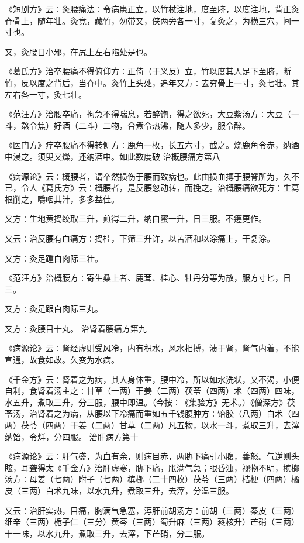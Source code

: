 \documentclass[a4paper,12pt,UTF8,twoside]{ctexbook}
\begin{document}
《短剧方》云∶灸腰痛法∶令病患正立，以竹杖注地，度至脐，以度注地，背正灸脊骨上，随年壮。灸竟，藏竹，勿带又，侠两旁各一寸，复灸之，为横三穴，间一寸也。

又，灸腰目小邪，在尻上左右陷处是也。

《葛氏方》治卒腰痛不得俯仰方∶正倚（于义反）立，竹以度其人足下至脐，断竹，反以度之背后，当脊中。灸竹上头处，追年又方∶去穷骨上一寸，灸七壮。其左右各一寸，灸七壮。

《范汪方》治腰卒痛，拘急不得喘息，若醉饱，得之欲死，大豆紫汤方∶大豆（一斗，熬令焦）好酒（二斗）二物，合煮令热沸，随人多少，服令醉。

《医门方》疗卒腰痛不得转侧方∶鹿角一枚，长五六寸，截之。烧鹿角令赤，纳酒中浸之。须臾又燥，还纳酒中。如此数度破
治概腰痛方第八

《病源论》云∶概腰者，谓卒然损伤于腰而致病也。此由损血搏于腰脊所为，久不已，令人《葛氏方》云∶概腰者，是反腰忽动转，而挽之。治概腰痛欲死方∶生葛根削之，嚼咽其汁，多多益佳。

又方∶生地黄捣绞取三升，煎得二升，纳白蜜一升，日三服。不瘥更作。

又云∶治反腰有血痛方∶捣桂，下筛三升许，以苦酒和以涂痛上，干复涂。

又方∶灸足踵白肉际三壮。

《范汪方》治概腰方∶寄生桑上者、鹿茸、桂心、牡丹分等为散，服方寸匕，日三。

又方∶灸足跟白肉际三丸。

又方∶灸腰目十丸。
治肾着腰痛方第九

《病源论》云∶肾经虚则受风冷，内有积水，风水相搏，渍于肾，肾气内着，不能宣通，故食如故。久变为水病。

《千金方》云∶肾着之为病，其人身体重，腰中冷，所以如水洗状，又不渴，小便自利，食肾着汤主之∶甘草（一两）干姜（二两）茯苓（四两）术（四两）四味，水五升，煮取三升，分三服，腰中即温。（今按∶《集验方》无术。）《僧深方》茯苓汤，治肾着之为病，从腰以下冷痛而重如五千钱腹肿方∶饴胶（八两）白术（四两）茯苓（四两）干姜（二两）甘草（二两）凡五物，以水一斗，煮取三升，去滓纳饴，令烊，分四服。
治肝病方第十

《病源论》云∶肝气盛，为血有余，则病目赤，两胁下痛引小腹，善怒。气逆则头眩，耳聋得太《千金方》治肝虚寒，胁下痛，胀满气急；眼昏浊，视物不明，槟榔汤方∶母姜（七两）附子（七两）槟榔（二十四枚）茯苓（三两）桔梗（四两）橘皮（三两）白术九味，以水九升，煮取三升，去滓，分温三服。

又云∶治肝实热，目痛，胸满气急塞，泻肝前胡汤方∶前胡（三两）秦皮（三两）细辛（三两）栀子仁（三分）黄芩（三两）蜀升麻（三两）蕤核升）芒硝（三两）十一味，以水九升，煮取三升，去滓，下芒硝，分二服。
\end{document}
